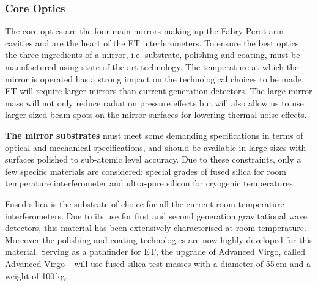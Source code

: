 \subsubsection{Core Optics}
\label{Sec:CoreOptics}
The core optics are the four main mirrors making up the Fabry-Perot arm cavities and are the heart of the ET interferometers.
To ensure the best optics, the three ingredients of a mirror, i.e. substrate,
polishing and coating, must be manufactured using state-of-the-art technology. The temperature at which the mirror is operated has a strong impact on the technological choices to be made.
ET will require larger mirrors than current generation detectors. The large mirror mass will not only reduce radiation pressure effects but will also allow us to use larger sized beam spots on the mirror surfaces for lowering thermal noise  effects. 

\textbf{The mirror substrates} must meet some demanding specifications in terms of optical and mechanical specifications, and should be available in large sizes with surfaces polished to sub-atomic level accuracy. Due to these constraints, only a few specific materials are considered: special grades of fused silica for room temperature interferometer and ultra-pure silicon for cryogenic temperatures.

Fused silica
is the substrate of choice for all the current room temperature interferometers.
Due to its use for first and second generation gravitational wave detectors, this material has been extensively characterised at room temperature.
Moreover the polishing and coating technologies are now highly developed for this material.
Serving as a pathfinder for ET, the upgrade of Advanced Virgo, called Advanced Virgo+ will use fused silica test masses with a diameter of  55\,cm and a weight of 100\,kg. 

